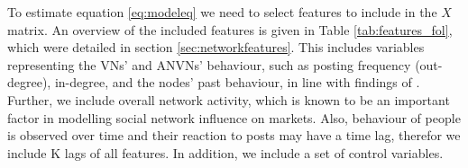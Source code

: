 
To estimate equation \eqref{eq:modeleq} we need to select features to include in the $X$ matrix.  An overview of the included features is given in Table \ref{tab:features_fol}, which were detailed in section \ref{sec:networkfeatures}. %
This includes variables representing the VNs' and ANVNs' behaviour, such as posting frequency (out-degree), in-degree, and the nodes' past behaviour, in line with findings of \citet{bhattacharya2019coevolution, Lu2013,Yu2022monitoring}. Further, we include overall network activity, which is known to be an important factor in modelling social network influence on markets. Also, behaviour of people is observed over time and their reaction to posts may have a time lag, therefor we include K lags of all features. %
In addition, we include a set of control variables. %

